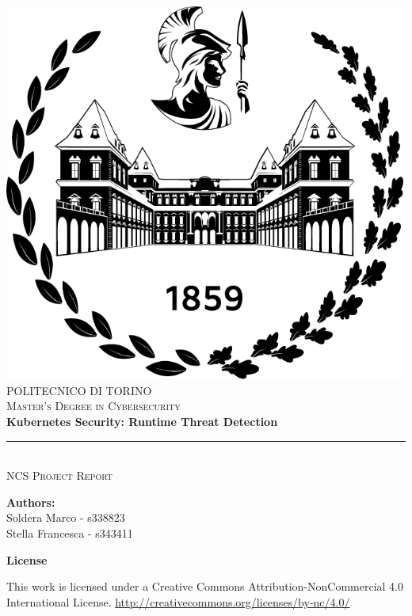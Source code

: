\documentclass[11pt]{article}
\title{\ctitle}
\author{} %
\date{June 20, 2025}
\newcommand{\ctitle}{Kubernetes Security: Runtime Threat Detection}
\begin{document}
\begin{titlepage}
    \centering
    \includegraphics[scale=0.4]{logoPoli.png}\\[1.0 cm]
    \textsc{\LARGE POLITECNICO DI TORINO}\\[0.2 cm]
    \textsc{\large Master’s Degree in Cybersecurity}\\[4 cm]
    {\huge \bfseries \ctitle}\\[0.2 cm]
    \rule{0.6\linewidth}{0.25 mm}\\[0.3 cm]
    \textsc{\Large NCS Project Report}\\[0.7 cm]

    \vspace{3cm} %

    \begin{flushleft} \large
        \textbf{Authors:}\\[0.1cm]
        Soldera Marco - s338823\\[0.1cm]
        Stella Francesca - s343411
    \end{flushleft}

    \vfill
\end{titlepage}

{\centering \Huge \textbf{License} \par}
\vspace{1cm} %
\noindent This work is licensed under a Creative Commons Attribution-NonCommercial 4.0 International License. \newline
\url{http://creativecommons.org/licenses/by-nc/4.0/}
\pagebreak
\end{document}
